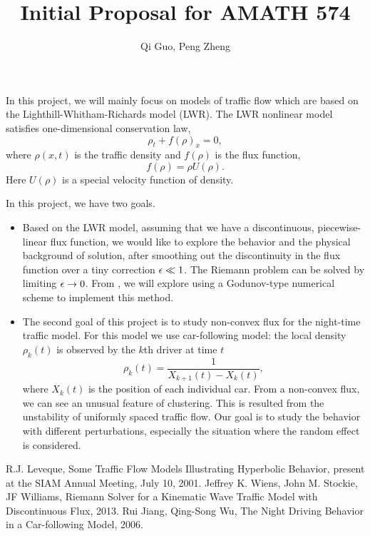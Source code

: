 \documentclass[11pt]{article}
\begin{document}
\title{\bf Initial Proposal for AMATH 574}
\author{Qi Guo, Peng Zheng}
\date{}
\maketitle

In this project, we will mainly focus on models of traffic flow which are based on the Lighthill-Whitham-Richards model (LWR). The LWR nonlinear model satisfies one-dimensional conservation law,
\[\rho_t+f(\rho)_x=0,\]
where $\rho(x,t)$ is the traffic density and $f(\rho)$ is the flux function,
\[f(\rho)=\rho U(\rho).\]
Here $U(\rho)$ is a special velocity function of density.

\vskip 8pt
In this project, we have two goals.
\begin{itemize}
\item Based on the LWR model, assuming that we have a discontinuous, piecewise-linear flux function, we would like to explore the behavior and the physical background of solution, after smoothing out the discontinuity in the flux function over a tiny correction $\epsilon\ll1$. The Riemann problem can be solved by limiting $\epsilon\rightarrow0$.
\vskip 8pt
From \cite{WS}, we will explore using a  Godunov-type numerical scheme to implement this method.
\item The second goal of this project is to study non-convex flux for the night-time traffic model. For this model we use car-following model: the local density $\rho_k(t)$ is observed by the $k$th driver at time $t$
\[\rho_k(t)=\frac{1}{X_{k+1}(t)-X_k(t)},\]
where $X_k(t)$ is the position of each individual car.
\vskip 8pt
From a non-convex flux, we can see an unusual feature of clustering. This is resulted from the unstability of uniformly spaced traffic flow. Our goal is to study the behavior with different perturbations, especially the situation where the random effect is considered.

\end{itemize}
{\footnotesize
\begin{thebibliography}{100}
 R.J. Leveque, Some Traffic Flow Models Illustrating Hyperbolic Behavior, present at the SIAM Annual Meeting, July 10, 2001.
 Jeffrey K. Wiens, John M. Stockie, JF Williams, Riemann Solver for a Kinematic Wave Traffic Model with Discontinuous Flux, 2013.
 Rui Jiang, Qing-Song Wu, The Night Driving Behavior in a Car-following Model, 2006.
\end{thebibliography}
}
\end{document}
